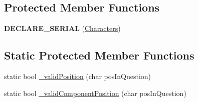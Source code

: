 \subsection*{Protected Member Functions}
\begin{DoxyCompactItemize}
\item 
\hypertarget{class_characters_ad71f0049d5bcf2d9c67278c237ad441b}{}\label{class_characters_ad71f0049d5bcf2d9c67278c237ad441b} 
{\bfseries D\+E\+C\+L\+A\+R\+E\+\_\+\+S\+E\+R\+I\+AL} (\hyperlink{class_characters}{Characters})
\end{DoxyCompactItemize}
\subsection*{Static Protected Member Functions}
\begin{DoxyCompactItemize}
\item 
static bool \hyperlink{class_characters_ab509433a15fb7604b2080e0568e41d0d}{\+\_\+valid\+Position} (char pos\+In\+Question)
\item 
static bool \hyperlink{class_characters_af2c85f79c62aba2dbf3e8d77e20ffb52}{\+\_\+valid\+Component\+Position} (char pos\+In\+Question)
\end{DoxyCompactItemize}
